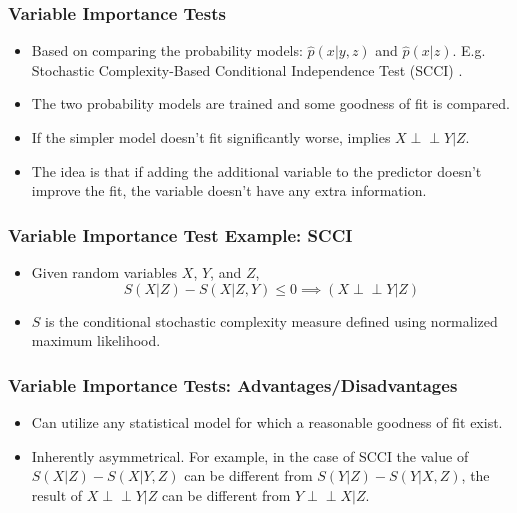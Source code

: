\documentclass{beamer}
\def\ci{\perp\!\!\!\!\!\perp}
\begin{document}
\begin{frame}
	\frametitle{Variable Importance Tests}
	\begin{itemize}
		\setlength\itemsep{1em}
		\item Based on comparing the probability models: $\hat{p}(x |
			y, z) $ and $ \hat{p}(x | z) $. E.g. Stochastic
			Complexity-Based Conditional Independence Test (SCCI) \footnotemark.
		\item The two probability models are trained and some goodness of fit is compared.
		\item If the simpler model doesn't fit significantly worse, implies $ X \ci Y | Z $.
		\item The idea is that if adding the additional variable to the predictor doesn't improve the fit, the variable
			doesn't have any extra information.
	\end{itemize}

\end{frame}

\begin{frame}
	\frametitle{Variable Importance Test Example: SCCI}
	\begin{itemize}
		\item Given random variables $ X $, $Y $, and $Z$,
			$$ S(X | Z ) - S(X|Z, Y) \le 0 \implies (X \ci Y | Z) $$
		\item $ S $ is the conditional stochastic complexity measure defined using normalized maximum likelihood.
	\end{itemize}
\end{frame}

\begin{frame}
	\frametitle{Variable Importance Tests: Advantages/Disadvantages}
	\begin{itemize}
		\item Can utilize any statistical model for which a reasonable goodness
			of fit exist.
		\item Inherently asymmetrical. For example, in the case of SCCI
			the value of $ S(X | Z) - S(X|Y,Z) $ can be different
			from $ S(Y|Z) - S(Y|X, Z) $, the result of $ X \ci Y |
			Z $ can be different from $ Y \ci X | Z $.
	\end{itemize}

\end{frame}
\end{document}
